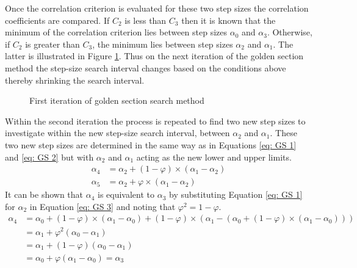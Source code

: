 \documentclass[12pt,oneside,openany,a4paper, %
english, %
masters-t, goldenblock]{usthesis}
\begin{document}
Once the correlation criterion is evaluated for these two step sizes the correlation coefficients are compared. If $C_2$ is less than $C_3$ then it is known that the minimum of the correlation criterion lies between step sizes $\alpha_0$ and $\alpha_3$. Otherwise, if $C_2$ is greater than $C_3$, the minimum lies between step sizes $\alpha_2$ and $\alpha_1$. The latter is illustrated in Figure \ref{fig: golden section 1}. Thus on the next iteration of the golden section method the step-size search interval changes based on the conditions above thereby shrinking the search interval. 
\begin{figure}[H]
\caption{First iteration of golden section search method}
\label{fig: golden section 1}
\end{figure}

Within the second iteration the process is repeated to find two new step sizes to investigate within the new step-size search interval, between $\alpha_2$ and $\alpha_1$. These two new step sizes are determined in the same way as in Equations \ref{eq: GS 1} and \ref{eq: GS 2} but with $\alpha_2$ and $\alpha_1$ acting as the new lower and upper limits.
\begin{align}
\label{eq: GS 3}
  \alpha_4 &=\alpha_2+(1-\varphi) \times (\alpha_1-\alpha_2) \\
  \alpha_5 &= \alpha_2+\varphi \times (\alpha_1-\alpha_2) 
\end{align}
It can be shown that $\alpha_4$ is equivalent to $\alpha_3$ by substituting Equation \ref{eq: GS 1} for $\alpha_2$ in Equation \ref{eq: GS 3} and noting that $\varphi^2=1-\varphi$.
\begin{align}
  \alpha_4 &=\alpha_0+(1-\varphi) \times (\alpha_1-\alpha_0)+(1-\varphi) \times (\alpha_1-(\alpha_0+(1-\varphi) \times (\alpha_1-\alpha_0))) \\
  &= \alpha_1 + \varphi^2 (\alpha_0-\alpha_1) \\
  &= \alpha_1 + (1-\varphi) (\alpha_0-\alpha_1) \\
  &= \alpha_0 + \varphi (\alpha_1- \alpha_0) = \alpha_3
\end{align}
\end{document}
